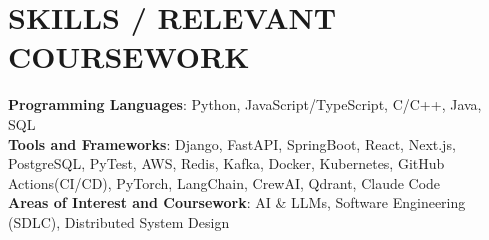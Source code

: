 \documentclass[letterpaper,11pt]{article}
\newcommand{\SectionListBegin}{\begin{itemize}[leftmargin=0.15in, label={}]}
\newcommand{\SectionListEnd}{\end{itemize}}
\newcommand{\swallow}[1]{}
\begin{document}
\section{SKILLS / RELEVANT COURSEWORK}
  \SectionListBegin
    \small{\item{
    \vspace{1mm}
     \textbf{Programming Languages}{: Python, JavaScript/TypeScript, C/C++, Java, SQL} \\
     \vspace{1mm}
     \textbf{Tools and Frameworks}{: Django, FastAPI, SpringBoot, React, Next.js, PostgreSQL, PyTest, AWS, Redis, Kafka, Docker, Kubernetes, GitHub Actions(CI/CD), PyTorch, LangChain, CrewAI, Qdrant, Claude Code}\\
     \vspace{1mm}
     \textbf{Areas of Interest and Coursework}{: AI \& LLMs, Software Engineering (SDLC), Distributed System Design\swallow{Data Structures \& Algorithms, Object Oriented Design (OOD), Computer Architecture}} \\
     \vspace{1mm}
    }}
  \SectionListEnd


\end{document}
